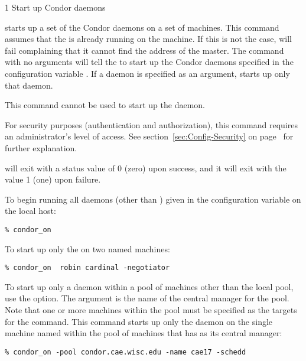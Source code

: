 \begin{ManPage}{\label{man-condor-on}}{1}
{Start up Condor daemons}
\Synopsis {}
\ToolArgsBase

\ToolArgsLocate \ToolArgsAffect

\ToolWhere \ToolArgsAffect


\Description 

 starts up a set of the Condor daemons on a set of
machines.
This command assumes that the  is already
running on the machine.
If this is not the case,  will
fail complaining that it cannot find the address of the master.
The command  with no arguments will
tell the  to start up the Condor daemons specified
in the configuration variable .
If a daemon is specified as an argument,
 starts up only that daemon.

This command cannot be used to start up the  daemon.

For security purposes (authentication and authorization),
this command requires an administrator's level of access.
See
section~\ref{sec:Config-Security} on page~\pageref{sec:Config-Security}
for further explanation.

\begin{Options}
	\ToolArgsDesc
\end{Options}

\ExitStatus

 will exit with a status value of 0 (zero) upon success,
and it will exit with the value 1 (one) upon failure.

\Examples
To begin running all daemons (other than ) given
in the configuration variable 
on the local host:
\begin{verbatim}
% condor_on
\end{verbatim}

To start up only the  on two named machines:
\begin{verbatim}
% condor_on  robin cardinal -negotiator
\end{verbatim}

To start up only a daemon within a pool of machines
other than the local pool, use the  option.
The argument is the name of the central manager for the pool.
Note that one or more machines within the pool must be
specified as the targets for the command.
This command starts up only the  daemon
on the single machine named  within the
pool of machines that has  as
its central manager:
\begin{verbatim}
% condor_on -pool condor.cae.wisc.edu -name cae17 -schedd
\end{verbatim}

\end{ManPage}
